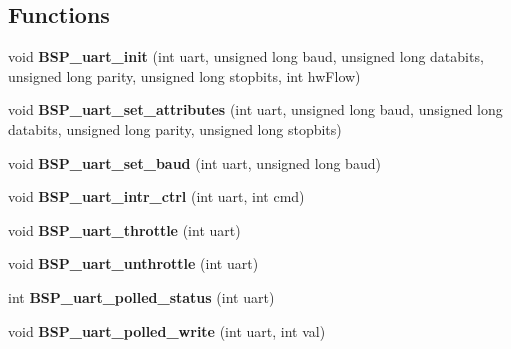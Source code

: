 \subsection*{Functions}
\begin{DoxyCompactItemize}
\item 
\mbox{\label{group__i386__uart_ga40b6add56421f15e9dd2859a95670682}} 
void {\bfseries B\+S\+P\+\_\+uart\+\_\+init} (int uart, unsigned long baud, unsigned long databits, unsigned long parity, unsigned long stopbits, int hw\+Flow)
\item 
\mbox{\label{group__i386__uart_ga0560db547c8c1847a8555614e8d1eb4f}} 
void {\bfseries B\+S\+P\+\_\+uart\+\_\+set\+\_\+attributes} (int uart, unsigned long baud, unsigned long databits, unsigned long parity, unsigned long stopbits)
\item 
\mbox{\label{group__i386__uart_gab8aa5370c521cd520100079e13a6790d}} 
void {\bfseries B\+S\+P\+\_\+uart\+\_\+set\+\_\+baud} (int uart, unsigned long baud)
\item 
\mbox{\label{group__i386__uart_ga5da5869dbc3558a9911b33f6545d1a9a}} 
void {\bfseries B\+S\+P\+\_\+uart\+\_\+intr\+\_\+ctrl} (int uart, int cmd)
\item 
\mbox{\label{group__i386__uart_ga3c901fc34c062d27275406e2ac9bc0ac}} 
void {\bfseries B\+S\+P\+\_\+uart\+\_\+throttle} (int uart)
\item 
\mbox{\label{group__i386__uart_gad0f3c6a23d7298abd870cb5bf8651676}} 
void {\bfseries B\+S\+P\+\_\+uart\+\_\+unthrottle} (int uart)
\item 
\mbox{\label{group__i386__uart_gaac112e82834ec1067ec68e68aa5ef5cf}} 
int {\bfseries B\+S\+P\+\_\+uart\+\_\+polled\+\_\+status} (int uart)
\item 
\mbox{\label{group__i386__uart_gad60edb62711f60bcddd520735bdb49c4}} 
void {\bfseries B\+S\+P\+\_\+uart\+\_\+polled\+\_\+write} (int uart, int val)
\item 
\mbox{\label{group__i386__uart_ga0264e692b5346a964317d4aedb648046}} 

\end{DoxyCompactItemize}
